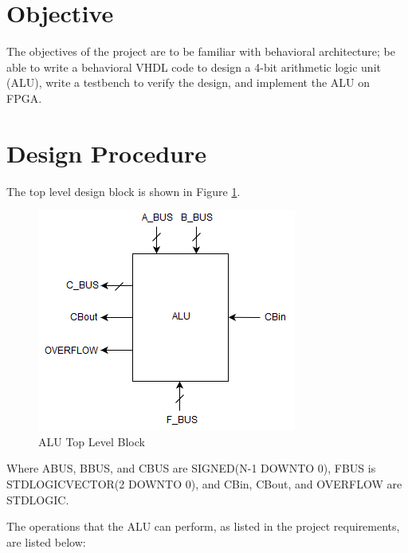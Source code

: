 \documentclass[12pt]{article}
\begin{document}

\newpage

\section{Objective} \label{sec:obj}
The objectives of the project are to be familiar with behavioral architecture; be able
to write a behavioral VHDL code to design a 4-bit arithmetic logic unit (ALU), write
a testbench to verify the design, and implement the ALU on FPGA.

\section{Design Procedure} \label{sec:desproc}
The top level design block is shown in Figure \ref{fig:toplevel}.

\begin{figure}[!h]
\setlength{\belowcaptionskip}{-10pt}
\begin{center}
\includegraphics[scale=0.5]{ALU_top_level.png}
\caption{ALU Top Level Block}
\label{fig:toplevel}
\end{center}
\end{figure}

Where A\textunderscore BUS, B\textunderscore BUS, and C\textunderscore BUS are SIGNED(N-1 DOWNTO 0), F\textunderscore BUS is STD\textunderscore LOGIC\textunderscore VECTOR(2 DOWNTO 0), and CBin, CBout, and OVERFLOW are STD\textunderscore LOGIC.

\vspace{14.5pt}

The operations that the ALU can perform, as listed in the project requirements, are listed below:
\end{document}
